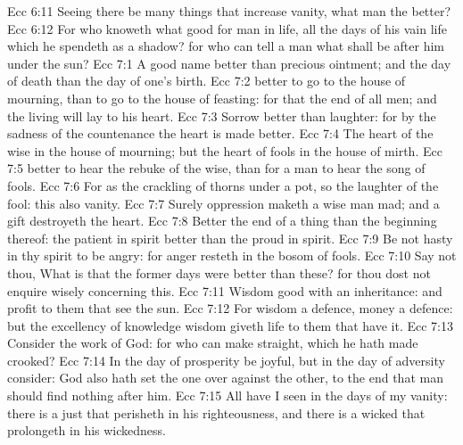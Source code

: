 \vs Ecc 6:11 Seeing there be many things that increase vanity, what  man the better?
\vs Ecc 6:12 For who knoweth what  good for man in  life, all the days of his vain life which he spendeth as a shadow? for who can tell a man what shall be after him under the sun?
\vs Ecc 7:1 A good name  better than precious ointment; and the day of death than the day of one's birth.
\vs Ecc 7:2  better to go to the house of mourning, than to go to the house of feasting: for that  the end of all men; and the living will lay  to his heart.
\vs Ecc 7:3 Sorrow  better than laughter: for by the sadness of the countenance the heart is made better.
\vs Ecc 7:4 The heart of the wise  in the house of mourning; but the heart of fools  in the house of mirth.
\vs Ecc 7:5  better to hear the rebuke of the wise, than for a man to hear the song of fools.
\vs Ecc 7:6 For as the crackling of thorns under a pot, so  the laughter of the fool: this also  vanity.
\vs Ecc 7:7 Surely oppression maketh a wise man mad; and a gift destroyeth the heart.
\vs Ecc 7:8 Better  the end of a thing than the beginning thereof:  the patient in spirit  better than the proud in spirit.
\vs Ecc 7:9 Be not hasty in thy spirit to be angry: for anger resteth in the bosom of fools.
\vs Ecc 7:10 Say not thou, What is  that the former days were better than these? for thou dost not enquire wisely concerning this.
\vs Ecc 7:11 Wisdom  good with an inheritance: and  profit to them that see the sun.
\vs Ecc 7:12 For wisdom  a defence,  money  a defence: but the excellency of knowledge  wisdom giveth life to them that have it.
\vs Ecc 7:13 Consider the work of God: for who can make  straight, which he hath made crooked?
\vs Ecc 7:14 In the day of prosperity be joyful, but in the day of adversity consider: God also hath set the one over against the other, to the end that man should find nothing after him.
\vs Ecc 7:15 All  have I seen in the days of my vanity: there is a just  that perisheth in his righteousness, and there is a wicked  that prolongeth  in his wickedness.
